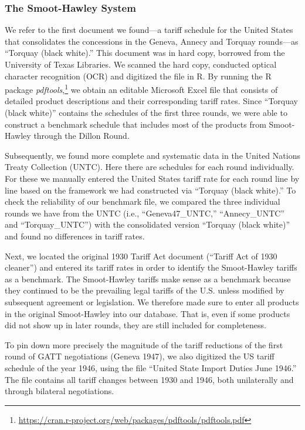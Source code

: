 \documentclass[
  12pt,
]{article}
\begin{document}
\hypertarget{the-smoot-hawley-system}{%
\subsubsection{The Smoot-Hawley System}\label{the-smoot-hawley-system}}

We refer to the first document we found---a tariff schedule for the United States that consolidates the concessions in the Geneva, Annecy and Torquay rounds---as ``Torquay (black white).'' This document was in hard copy, borrowed from the University of Texas Libraries. We scanned the hard copy, conducted optical character recognition (OCR) and digitized the file in R. By running the R package \emph{pdftools},\footnote{\url{https://cran.r-project.org/web/packages/pdftools/pdftools.pdf}} we obtain an editable Microsoft Excel file that consists of detailed product descriptions and their corresponding tariff rates. Since ``Torquay (black white)'' contains the schedules of the first three rounds, we were able to construct a benchmark schedule that includes most of the products from Smoot-Hawley through the Dillon Round.

Subsequently, we found more complete and systematic data in the United Nations Treaty Collection (UNTC). Here there are schedules for each round individually. For these we manually entered the United States tariff rate for each round line by line based on the framework we had constructed via ``Torquay (black white).'' To check the reliability of our benchmark file, we compared the three individual rounds we have from the UNTC (i.e., ``Geneva47\_UNTC,'' ``Annecy\_UNTC'' and ``Torquay\_UNTC'') with the consolidated version ``Torquay (black white)'' and found no differences in tariff rates.

Next, we located the original 1930 Tariff Act document (``Tariff Act of 1930 cleaner'') and entered its tariff rates in order to identify the Smoot-Hawley tariffs as a benchmark. The Smoot-Hawley tariffs make sense as a benchmark because they continued to be the prevailing legal tariffs of the U.S. unless modified by subsequent agreement or legislation. We therefore made sure to enter all products in the original Smoot-Hawley into our database. That is, even if some products did not show up in later rounds, they are still included for completeness.

To pin down more precisely the magnitude of the tariff reductions of the first round of GATT negotiations (Geneva 1947), we also digitized the US tariff schedule of the year 1946, using the file ``United State Import Duties June 1946.'' The file contains all tariff changes between 1930 and 1946, both unilaterally and through bilateral negotiations.
\end{document}

